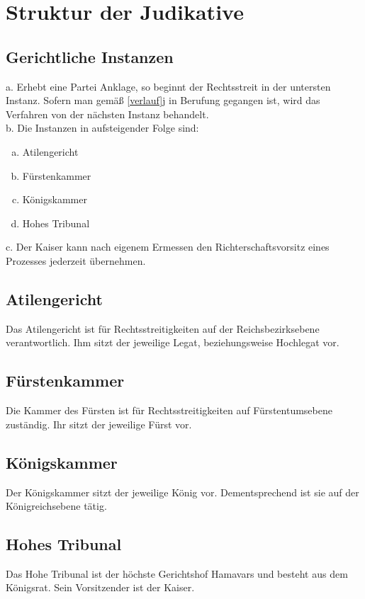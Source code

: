 \documentclass{article}
\begin{document}
\section{Struktur der Judikative}

\subsection{Gerichtliche Instanzen}
a. Erhebt eine Partei Anklage, so beginnt der Rechtsstreit in der untersten Instanz. Sofern man gemäß \ref{verlauf}j in Berufung gegangen ist, wird das Verfahren von der nächsten Instanz behandelt.\\
b. Die Instanzen in aufsteigender Folge sind:
\begin{enumerate}[a)]
	\item Atilengericht
	\item Fürstenkammer
	\item Königskammer
	\item Hohes Tribunal
\end{enumerate}
c. Der Kaiser kann nach eigenem Ermessen den Richterschaftsvorsitz eines Prozesses jederzeit übernehmen.

\subsection{Atilengericht}
Das Atilengericht ist für Rechtsstreitigkeiten auf der Reichsbezirksebene verantwortlich. Ihm sitzt der jeweilige Legat, beziehungsweise Hochlegat vor.

\subsection{Fürstenkammer}
Die Kammer des Fürsten ist für Rechtsstreitigkeiten auf Fürstentumsebene zuständig. Ihr sitzt der jeweilige Fürst vor.

\subsection{Königskammer}
Der Königskammer sitzt der jeweilige König vor. Dementsprechend ist sie auf der Königreichsebene tätig.

\subsection{Hohes Tribunal}
Das Hohe Tribunal ist der höchste Gerichtshof Hamavars und besteht aus dem Königsrat. Sein Vorsitzender ist der Kaiser.
\end{document}
